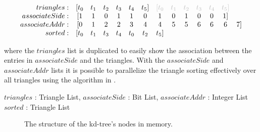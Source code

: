 \begin{displaymath}
  \begin{array}{r c c c c c c c c c c c c c}
    triangles: & [t_0 & t_1 & t_2 & t_3 & t_4 & t_5] & \color{lightgray}[t_0 & \color{lightgray}t_1 & \color{lightgray}t_2 & \color{lightgray}t_3 & \color{lightgray}t_4 & \color{lightgray}t_5]\\
    associateSide: & [1 & 1 & 0 & 1 & 1 & 0 & 1 & 0 & 1 & 0 & 0 & 1]\\
    associateAddr: & [0 & 1 & 2 & 2 & 3 & 4 & 4 & 5 & 5 & 6 & 6 & 6 & 7]\\
    sorted: & [t_0 & t_1 & t_3 & t_4 & t_0 & t_2 & t_5]
  \end{array}
\end{displaymath}

where the $triangles$ list is duplicated to easily show the association between
the entries in $associateSide$ and the triangles. With the $associateSide$ and
$associateAddr$ lists it is possible to parallelize the triangle sorting
effectively over all triangles using the algorithm in .

\begin{algorithm}
  \caption{Parallel triangle sorting.}
  \label{alg:triangleSort}
  \begin{algorithmic}
              {$triangles$ : Triangle List, $associateSide$ : Bit List, $associateAddr$ : Integer List}
              {$sorted$ : Triangle List}
              {
                \ENDIF
                \ENDIF
               \ENDFOR}
  \end{algorithmic}
\end{algorithm}


\begin{figure}
  \centering
  \caption{The structure of the kd-tree's nodes in memory.}
  \label{fig:nodeStructure}
\end{figure}

